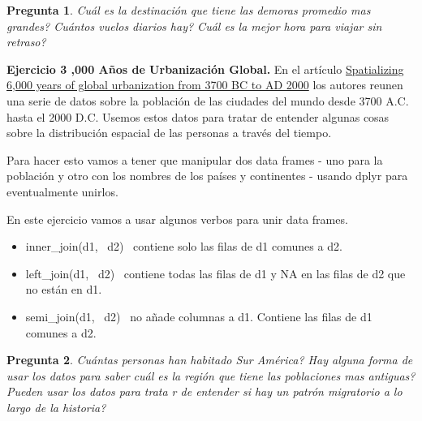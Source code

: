 \documentclass[12pt]{article}
\newtheorem{pregunta}{Pregunta}
\begin{document}
\begin{pregunta}
Cuál es la destinación que tiene las demoras promedio mas grandes? Cuántos vuelos diarios hay? Cuál es la mejor hora para viajar sin retraso?
\end{pregunta}
\hline
\vspace{1em}
\textbf{Ejercicio 3 ,000 Años de Urbanización Global.}
\vspace{1em}
\hline
\vspace{1em}
En el artículo \href{http://www.nature.com/articles/sdata201634}{Spatializing 6,000 years of global urbanization from 3700 BC to AD 2000} los autores reunen una serie de datos sobre la población de las ciudades del mundo desde 3700 A.C. hasta el 2000 D.C. Usemos estos datos para tratar de entender algunas cosas sobre la distribución espacial de las personas a través del tiempo.
\par
Para hacer esto vamos a tener que manipular dos data frames - uno para la población y otro con los nombres de los países y continentes - usando dplyr para eventualmente unirlos.
\par
En este ejercicio vamos a usar algunos verbos para unir data frames.
\begin{itemize}
  \item inner\_join(d1, \ d2) \ contiene solo las filas  de d1 comunes a d2.
  \item left\_join(d1, \ d2) \ contiene todas las filas de d1 y NA en las filas de d2 que no están en d1.
  \item semi\_join(d1, \ d2) \ no añade columnas a d1. Contiene las filas de d1 comunes a d2.
\end{itemize}
\begin{pregunta}
Cuántas personas han habitado Sur América? Hay alguna forma de usar los datos para saber cuál es la región que tiene las poblaciones mas antiguas? Pueden usar los datos para trata r de entender si hay un patrón migratorio a lo largo de la historia?
\end{pregunta}
\end{document}
